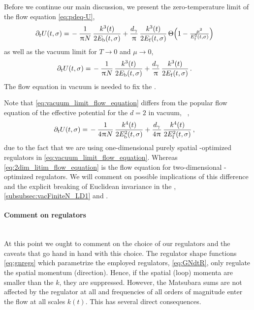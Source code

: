 Before we continue our main discussion, we present the zero-temperature limit of the \frg{} flow equation \eqref{eq:pdeq-U},
\begin{align}
	\partial_t U ( t,  \sigma )	= \, & - \frac{1}{\mkern1.0mu\uppi\mkern1.0mu N} \, \frac{k^3 ( t )}{2 E_\mathrm{b} ( t, \sigma )}  + \frac{d_\gamma}{\mkern1.0mu\uppi\mkern1.0mu} \, \frac{k^3 ( t )}{2 E_\mathrm{f} ( t, \sigma )} \, \Theta \Big( 1 - \tfrac{\mu^2}{E^2_\mathrm{f} ( t, \sigma )} \Big)	\label{eq:zero_t_flow_equation}
\end{align}
as well as the vacuum limit for $T \rightarrow 0$ and $\mu \rightarrow 0$,
	\begin{align}
		\partial_t U ( t,  \sigma ) = \, & - \frac{1}{\mkern1.0mu\uppi\mkern1.0mu N} \, \frac{k^3 ( t )}{2 E_\mathrm{b} ( t, \sigma )} + \frac{d_\gamma}{\mkern1.0mu\uppi\mkern1.0mu} \, \frac{k^3 ( t )}{2 E_\mathrm{f} ( t, \sigma )} \, .	\label{eq:vacuum_limit_flow_equation}
	\end{align}
The \frg{} flow equation in vacuum is needed to fix the \ic{}.
	
Note that \cref{eq:vacuum_limit_flow_equation} differs from the popular \lpa{} flow equation of the effective potential for the $d=2$ \gnym{} in vacuum, \cf{}\ ,
\begin{align}
	\partial_t U ( t,  \sigma ) = \, & - \frac{1}{4 \mkern1.0mu\uppi\mkern1.0mu N} \, \frac{k^4 ( t )}{2 E_\mathrm{b}^2 ( t, \sigma )} + \frac{d_\gamma}{4 \mkern1.0mu\uppi\mkern1.0mu} \, \frac{k^4 ( t )}{2 E_\mathrm{f}^2 ( t, \sigma )} \, ,	\label{eq:2dim_litim_flow_equation}
\end{align}	
due to the fact that we are using one-dimensional purely spatial \lpa{}-optimized regulators in \cref{eq:vacuum_limit_flow_equation}.
Whereas \cref{eq:2dim_litim_flow_equation} is the flow equation for two-dimensional \lpa{}-optimized regulators.
We will comment on possible implications of this difference and the explicit breaking of Euclidean \Poincare{} invariance in the , \cref{subsubsec:vacFiniteN_LD1} and \gnAppNum{}.

\paragraph{Comment on regulators}\label{paragraph:comment_on_the_regulators}\mbox{}\\%
At this point we ought to comment on the choice of our regulators and the caveats that go hand in hand with this choice.
The regulator shape functions \eqref{eq:gnregs} which parametrize the employed regulators, \cf{} \cref{eq:GNdtR}, only regulate the spatial momentum (direction).
Hence, if the spatial (loop) momenta are smaller than the \rgscale{} $k$, they are suppressed.
However, the Matsubara sums are not affected by the regulator at all and frequencies of all orders of magnitude enter the \frg{} flow at all scales $k ( t )$.
This has several direct consequences. 

